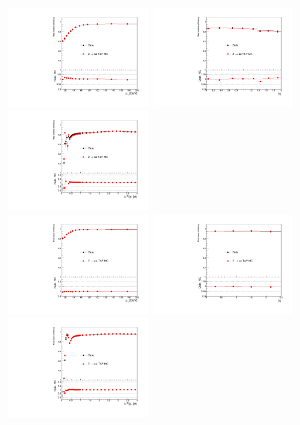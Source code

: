 \begin{figure}[htbp]
\includegraphics[width=0.33\textwidth]{real_efficiency_ratio_plot_electron_pt.pdf}
\includegraphics[width=0.33\textwidth]{real_efficiency_ratio_plot_electron_eta.pdf}
\includegraphics[width=0.33\textwidth]{real_efficiency_ratio_plot_electron_dRjet.pdf}\\
\includegraphics[width=0.33\textwidth]{real_efficiency_ratio_plot_muon_pt.pdf}
\includegraphics[width=0.33\textwidth]{real_efficiency_ratio_plot_muon_eta.pdf}
\includegraphics[width=0.33\textwidth]{real_efficiency_ratio_plot_muon_dRjet.pdf}

\end{figure}
